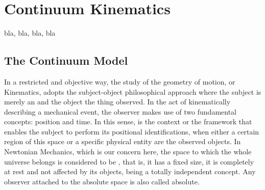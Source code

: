 \chapter{Continuum Kinematics}

bla, bla, bla, bla


\section{The Continuum Model}


In a restricted and objective way, the study of the geometry of motion, or Kinematics, adopts the subject-object philosophical approach where the subject is merely an  and the object the thing observed. In the act of kinematically describing a mechanical event, the observer makes use of two fundamental concepts: position and time. In this sense,  is the context or the framework that enables the subject to perform its positional identifications, when either a certain region of this space or a specific physical entity are the observed objects. In Newtonian Mechanics, which is our concern here, the space to which the whole universe belongs is considered to be , that is, it has a fixed size, it is completely at rest and not affected by its objects, being a totally independent concept. Any observer attached to the absolute space is also called absolute. 

